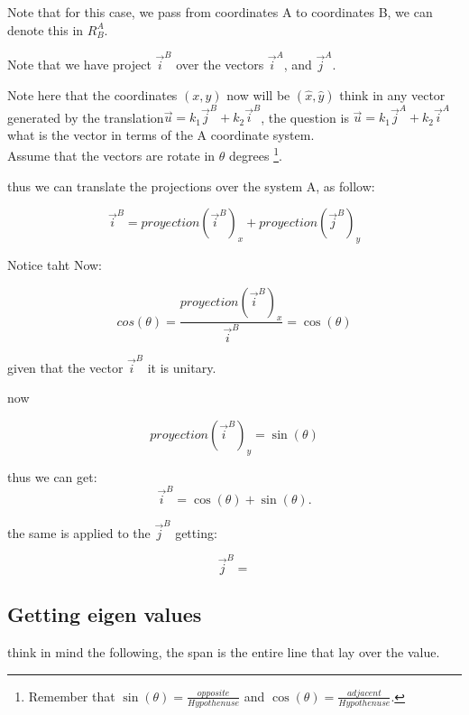 \documentclass[10pt,a4paper]{article}
\begin{document}
Note that for this case, we pass from coordinates  A to coordinates B, we can denote this in $R^{A}_{B}$.

Note that we have project $\vec{i}^{B}$ over the vectors $\vec{i}^{A}$, and $\vec{j}^{A}$.

Note here that the coordinates $(x,y)$ now will be $(\hat{x},\hat{y})$ think in any vector generated by the translation$\vec{u} = k_{1}\vec{j}^{B} + k_{2}\vec{i}^{B}$, the question  is $\vec{u} = k_{1}\vec{j}^{A} + k_{2}\vec{i}^{A}$ what is the vector in terms of the A coordinate system.
\\

Assume that the vectors are rotate in $\theta$ degrees \footnote{
Remember that $\sin(\theta) = \frac{opposite}{Hypothenuse}$ and $\cos(\theta) = \frac{adjacent}{Hypothenuse}$.
}.

thus we can translate the projections over the system A, as follow:


\begin{equation}
\vec{i}^{B} = proyection(\vec{i}^{B})_{x} + proyection(\vec{j}^{B})_{y}
\end{equation}

Notice taht 
Now:

\begin{equation}
cos(\theta)= \frac{proyection(\vec{i}^{B})_{x}}{\vec{i}^{B}} = \cos(\theta)
\end{equation}

given that the vector $\vec{i}^{B}$ it is unitary. 


now 

\begin{equation}
proyection(\vec{i}^{B})_{y} = \sin (\theta)
\end{equation}

thus we can get:
\begin{equation}
\vec{i}^{B} = \cos (\theta) + \sin(\theta).
\end{equation}

the same is applied to the 
$\vec{j}^{B}$ getting:

\begin{equation}
\vec{j}^{B} = 
\end{equation}


\subsection{Getting eigen values}

think in mind the following, the span is the entire line that lay over the value.
\end{document}
